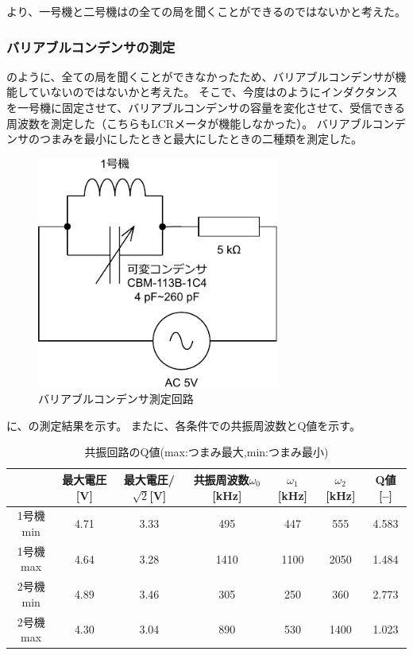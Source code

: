\documentclass[report.tex]{subfiles}
\begin{document}
より、一号機と二号機はの全ての局を聞くことができるのではないかと考えた。

\subsubsection{バリアブルコンデンサの測定}

のように、全ての局を聞くことができなかったため、バリアブルコンデンサが機能していないのではないかと考えた。
そこで、今度はのようにインダクタンスを一号機に固定させて、バリアブルコンデンサの容量を変化させて、受信できる周波数を測定した（こちらもLCRメータが機能しなかった）。
バリアブルコンデンサのつまみを最小にしたときと最大にしたときの二種類を測定した。

\begin{figure}[H]
	\centering
	\includegraphics[width=8cm]{fig/inda3.pdf}
	\caption{バリアブルコンデンサ測定回路}
	\label{fig:inda3}
\end{figure}

に、の測定結果を示す。
またに、各条件での共振周波数とQ値を示す。

\begin{table}[H]
	\centering
	\caption{共振回路のQ値(max:つまみ最大,min:つまみ最小)}
	\label{tab:Q}
	\begin{tabular}{ccccccc} \hline
		       & 最大電圧[V] & 最大電圧/\(\sqrt{2}\)[V] & 共振周波数\(\omega_0\)[kHz] & \(\omega_1\)[kHz] & \(\omega_2\)[kHz] & Q値[--] \\ \hline
		1号機min & 4.71    & 3.33                 & 495                    & 447               & 555               & 4.583  \\
		1号機max & 4.64    & 3.28                 & 1410                   & 1100              & 2050              & 1.484  \\
		2号機min & 4.89    & 3.46                 & 305                    & 250               & 360               & 2.773  \\
		2号機max & 4.30    & 3.04                 & 890                    & 530               & 1400              & 1.023  \\ \hline
	\end{tabular}
\end{table}
\end{document}
